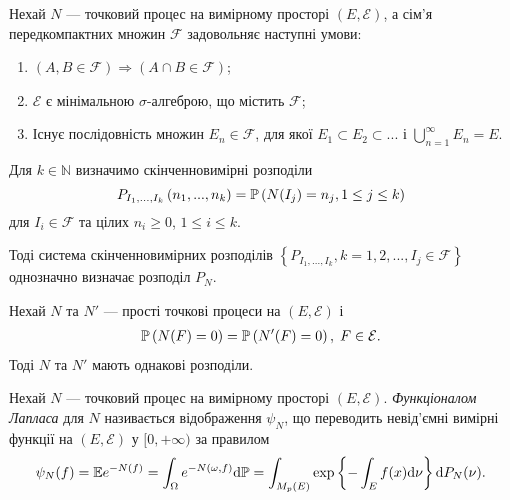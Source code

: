 \begin{theorem}\label{th:point_proc_uniqueness}
    Нехай $N$ --- точковий процес на вимірному просторі
    $\left(E, \mathcal{E}\right)$, а сім'я передкомпактних множин $\mathcal{F}$
    задовольняє наступні умови:
    \begin{enumerate}
        \item $\left(A, B \in \mathcal{F}\right) \Rightarrow \left(A \cap B \in \mathcal{F}\right)$;
        \item $\mathcal{E}$ є мінімальною $\sigma$-алгеброю, що містить $\mathcal{F}$;
        \item Існує послідовність множин $E_n \in \mathcal{F}$, для якої
        $E_1 \subset E_2 \subset ...$ і $\bigcup_{n=1}^{\infty} E_n = E$.
    \end{enumerate}
    Для $k \in \mathbb{N}$ визначимо скінченновимірні розподіли
    $$
        P_{I_1,...,I_k} \left(n_1, ..., n_k\right) = 
        \P{N(I_j) = n_j, 1\leq j \leq k}
    $$
    для $I_i \in \mathcal{F}$ та цілих $n_i \geq 0$, $1 \leq i \leq k$.
    
    Тоді система скінченновимірних розподілів
    $\left\{P_{I_1,...,I_k}, k = 1,2,..., I_j \in \mathcal{F} \right\}$
    однозначно визначає розподіл $P_N$.
\end{theorem}

\begin{theorem}\label{th:point_proc_uniqueness_simple}
    Нехай $N$ та $N'$ --- прості точкові процеси на $\left(E, \mathcal{E}\right)$ і
    \begin{gather*}
        \P{N(F) = 0} = \P{N'(F) = 0}, \; F \in \mathcal{E}.
    \end{gather*}
    Тоді $N$ та $N'$ мають однакові розподіли.
\end{theorem}

\begin{definition}
    Нехай $N$ --- точковий процес на вимірному просторі
    $\left(E, \mathcal{E}\right)$. \emph{Функціоналом Лапласа} для $N$
    називається відображення $\psi_N$, що переводить невід'ємні
    вимірні функції на $\left(E, \mathcal{E}\right)$ у $[0, +\infty)$
    за правилом
    \begin{gather}
        \psi_N(f) = \E e^{-N(f)} = \int_{\Omega} e^{-N(\omega, f)} \d \mathbb{P} = 
        \int_{M_p(E)} \exp\left\{ -\int_E f(x) \d \nu\right\} \d P_N (\nu).
    \end{gather}
\end{definition}

